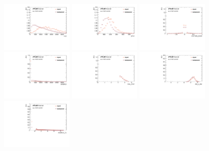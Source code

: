 \begin{figure}[htbp]
  \centering
 \includegraphics[width=0.3\textwidth]{figures/VBF/BDT_mJJ_2cen.pdf}
 \includegraphics[width=0.3\textwidth]{figures/VBF/BDT_pTJJ_2cen.pdf}
 \includegraphics[width=0.3\textwidth]{figures/VBF/BDT_cosTheta_2cen.pdf}\\
 \includegraphics[width=0.3\textwidth]{figures/VBF/BDT_deltaMJJ_2cen.pdf}
 \includegraphics[width=0.3\textwidth]{figures/VBF/BDT_maxJ1J2_2cen.pdf}
 \includegraphics[width=0.3\textwidth]{figures/VBF/BDT_etaJstar_2cen.pdf}\\
 \includegraphics[width=0.3\textwidth]{figures/VBF/BDT_mindRJ1_2cen.pdf}

\end{figure}
